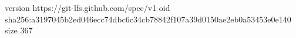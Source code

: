 version https://git-lfs.github.com/spec/v1
oid sha256:a3197045b2ed046ecc74dbc6c34cb78842f107a39d0150ae2eb0a53453e0e140
size 367

